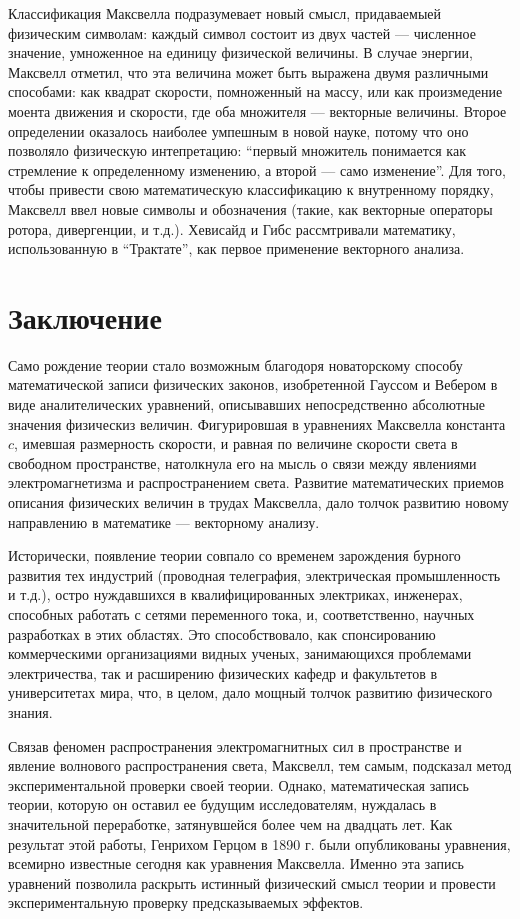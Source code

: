\documentclass[12pt, oneside, a4paper]{article}
\begin{document}
Классификация Максвелла подразумевает новый смысл, придаваемыей физическим символам: каждый символ состоит из двух частей --- численное значение, умноженное на единицу физической величины. В случае энергии, Максвелл отметил, что эта величина может быть выражена двумя различными способами: как квадрат скорости, помноженный на массу, или как  произмедение моента движения и скорости, где оба множителя --- векторные величины. Второе определении оказалось наиболее умпешным в новой науке, потому что оно позволяло физическую интепретацию: ``первый множитель понимается как стремление к определенному изменению, а второй --- само изменение''. Для того, чтобы привести свою математическую классификацию к внутренному порядку, Максвелл ввел новые символы и обозначения (такие, как векторные операторы ротора, дивергенции, и т.д.). Хевисайд и Гибс рассмтривали математику, использованную в ``Трактате'', как первое применение векторного анализа.

\section{Заключение}
Само рождение теории стало возможным благодоря новаторскому способу математической записи физических законов, изобретенной Гауссом и Вебером в виде аналителических уравнений, описывавших непосредственно абсолютные значения физическиз величин. Фигурировшая в уравнениях Максвелла константа $c$, имевшая размерность скорости, и равная по величине скорости света в свободном пространстве, натолкнула его на мысль о связи между явлениями электромагнетизма и распространением света. Развитие математических приемов описания физических величин в трудах Максвелла, дало толчок развитию новому направлению в математике --- векторному анализу. 

Исторически, появление теории совпало со временем зарождения бурного развития тех индустрий (проводная телеграфия, электрическая промышленность и т.д.), остро нуждавшихся в квалифицированных электриках, инженерах, способных работать с сетями переменного тока, и, соответственно, научных разработках в этих областях. Это способствовало, как спонсированию коммерческими организациями видных ученых, занимающихся проблемами электричества, так и расширению  физических кафедр и факультетов в университетах мира, что, в целом, дало мощный толчок развитию физического знания.

Связав феномен распространения электромагнитных сил в пространстве и явление волнового распространения света, Максвелл, тем самым, подсказал метод экспериментальной проверки своей теории. Однако, математическая запись теории, которую он оставил ее будущим исследователям, нуждалась в значительной переработке, затянувшейся более чем на двадцать лет.  Как результат этой работы, Генрихом Герцом в 1890 г. были опубликованы уравнения, всемирно известные сегодня как уравнения Максвелла. Именно эта запись уравнений позволила раскрыть истинный физический смысл теории и провести экспериментальную проверку предсказываемых эффектов. 
\end{document}
